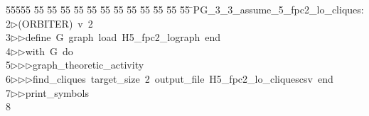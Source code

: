 %
%
\begin{tabbing}
55555 \= 55 \= 55 \= 55 \= 55 \= 55 \= 55 \= 55 \= 55 \= 55 \= 55 \= 55 \= 55 \= \>PG\_3\_3\_assume\_5\_fpc2\_lo\_cliques:\\[0pt]
2\>$\triangleright$\>(ORBITER)\ v\ 2\ \\[0pt]
3\>$\triangleright$\>$\triangleright$\>define\ G\ graph\ load\ H5\_fpc2\_lograph\ end\ \\[0pt]
4\>$\triangleright$\>$\triangleright$\>with\ G\ do\ \\[0pt]
5\>$\triangleright$\>$\triangleright$\>$\triangleright$\>graph\_theoretic\_activity\ \\[0pt]
6\>$\triangleright$\>$\triangleright$\>$\triangleright$\>find\_cliques\ target\_size\ 2\ output\_file\ H5\_fpc2\_lo\_cliquescsv\ end\ \\[0pt]
7\>$\triangleright$\>$\triangleright$\>print\_symbols\\[0pt]
8\>\end{tabbing}
